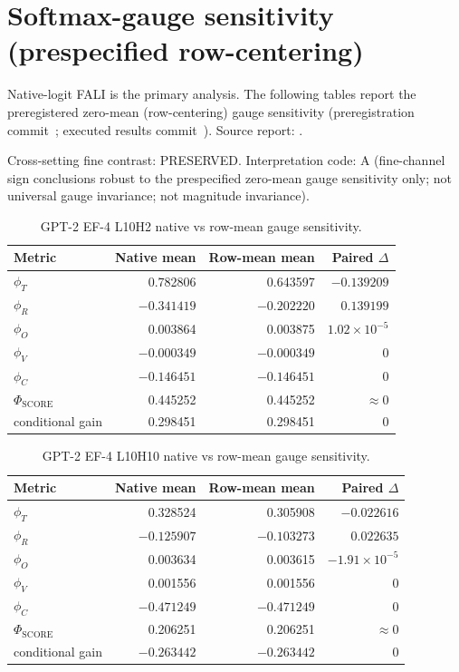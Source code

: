 \documentclass[pdflatex,sn-apa]{sn-jnl}
\begin{document}
\section{Softmax-gauge sensitivity (prespecified row-centering)}

Native-logit FALI is the primary analysis. The following tables report the
preregistered zero-mean (row-centering) gauge sensitivity (preregistration
commit~; executed results
commit~). Source report:
.

Cross-setting fine contrast: PRESERVED. Interpretation code: A
(fine-channel sign conclusions robust to the prespecified zero-mean gauge
sensitivity only; not universal gauge invariance; not magnitude invariance).

\begin{table}[h]
\centering
\caption{GPT-2 EF-4 L10H2 native vs row-mean gauge sensitivity.}
\begin{tabular}{lrrr}
\toprule
Metric & Native mean & Row-mean mean & Paired $\Delta$ \\
\midrule
$\phi_T$ & 0.782806 & 0.643597 & $-0.139209$ \\
$\phi_R$ & $-0.341419$ & $-0.202220$ & $0.139199$ \\
$\phi_O$ & 0.003864 & 0.003875 & $1.02\times10^{-5}$ \\
$\phi_V$ & $-0.000349$ & $-0.000349$ & $0$ \\
$\phi_C$ & $-0.146451$ & $-0.146451$ & $0$ \\
$\Phi_{\mathrm{SCORE}}$ & 0.445252 & 0.445252 & $\approx0$ \\
conditional gain & 0.298451 & 0.298451 & $0$ \\
\bottomrule
\end{tabular}
\end{table}

\begin{table}[h]
\centering
\caption{GPT-2 EF-4 L10H10 native vs row-mean gauge sensitivity.}
\begin{tabular}{lrrr}
\toprule
Metric & Native mean & Row-mean mean & Paired $\Delta$ \\
\midrule
$\phi_T$ & 0.328524 & 0.305908 & $-0.022616$ \\
$\phi_R$ & $-0.125907$ & $-0.103273$ & $0.022635$ \\
$\phi_O$ & 0.003634 & 0.003615 & $-1.91\times10^{-5}$ \\
$\phi_V$ & 0.001556 & 0.001556 & $0$ \\
$\phi_C$ & $-0.471249$ & $-0.471249$ & $0$ \\
$\Phi_{\mathrm{SCORE}}$ & 0.206251 & 0.206251 & $\approx0$ \\
conditional gain & $-0.263442$ & $-0.263442$ & $0$ \\
\bottomrule
\end{tabular}
\end{table}
\end{document}
